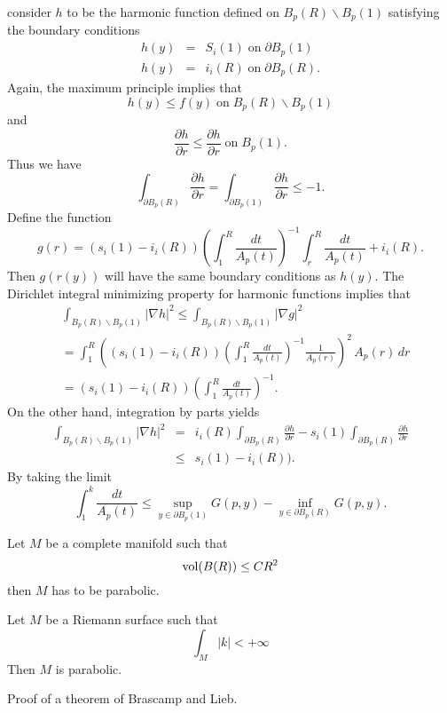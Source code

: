  consider $h$ to be the harmonic function defined on $ B_p (R) \backslash B_p (1) $ satisfying the boundary conditions
%
\begin{eqnarray*}
h(y) & = & S_i (1) \; \mbox{on}\; \partial B_p (1) \\
h(y) & = & i_i (R) \; \mbox{on}\; \partial B_p (R) .
\end{eqnarray*}
%
Again, the maximum principle implies that 
%
\[ h(y) \leq f (y) \; \mbox{on}\; B_p (R) \backslash B_p (1) \]
and
\[ \frac{\partial h}{\partial r} \leq \frac{\partial h}{\partial r} \; \mbox{on}\; B_p (1)  .\]
%
Thus we have 
%
\[  \int _{\partial B_{p} (R)} \frac{\partial h}{\partial r} = \int _{\partial B_{p} (1) }\frac{\partial h}{\partial r}
 \leq - 1 .\]
%
Define the function 
%
\[g(r) = (s_i (1) - i_i (R) ) \left( \int^R_1 \frac{dt}{A_p (t)} \right) ^{-1} \int ^R_r \frac{dt}{A_p (t) } + i_i (R). \]
Then $ g (r (y)) $ will have the same boundary conditions as $ h(y)$. The Dirichlet integral minimizing property for harmonic functions implies that 
%
\begin{align*}
&\int_{B_{p} (R) \backslash B_{p} (1)} |\nabla h |^2 \leq \int_{B_{p} (R) \backslash B_{p} (1)}  |\nabla g|^2 \\
& =  \int^R_1 \left( ( s_i (1) - i _i (R)) \left( \int^R_1 \frac{dt}{A_p (t)} \right) ^{-1}  \frac{1}{A_p (r)} \right) ^2 \, A_p (r) \, dr \\
& =  \left(  s_i (1) - i _i (R)\right) \left( \int^R_1 \frac{dt}{A_p (t)} \right) ^{-1}.
\end{align*}
%
On the other hand, integration by parts yields 
%
\begin{eqnarray*}
\int_{B_{p} (R) \backslash B_{p} (1)} |\nabla h |^2 & = & i_i(R)\int_{\partial B_{p} (R) } \frac{\partial h}{\partial r } -s_i(1) \int_{\partial B_{p} (R) }\frac{\partial h}{\partial r }\\
& \leq &    s_i (1) - i _i (R))  .
\end{eqnarray*}
%
By taking the limit
%
\[\int ^k_1 \frac{dt}{A_p (t)}  \leq \sup _{y \in \partial B_{p} (1) } G (p, y) - \inf _{y \in \partial B_{p} (R)} G (p , y). \]

\begin{corollary} Let $ M$ be a complete manifold such that 
%
\[ {\rm vol} (B (R)) \leq CR^2 \]
then $M$ has to be parabolic.
\end{corollary}

\begin{corollary}
Let $M$ be a Riemann surface such that 
%
\[ \int_M |k| < + \infty\]
%
Then $M$ is parabolic.
\end{corollary}
Proof of a theorem of Brascamp and Lieb.

